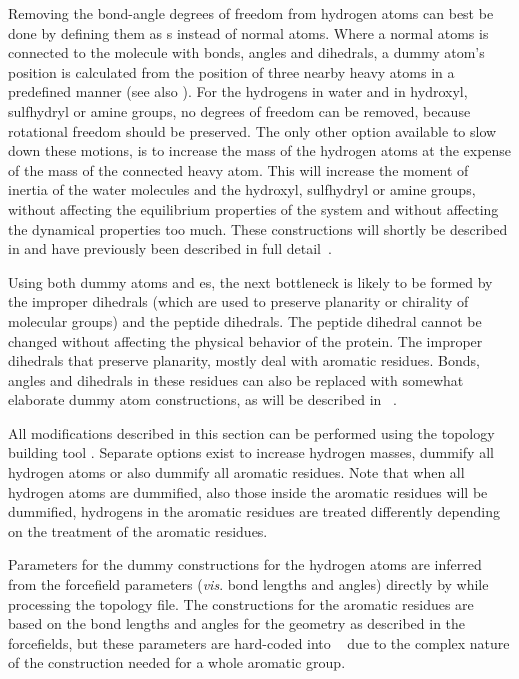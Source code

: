 Removing the bond-angle degrees of freedom from hydrogen atoms can
best be done by defining them as s instead of
normal atoms. Where a normal atoms is connected to the molecule with
bonds, angles and dihedrals, a dummy atom's position is calculated
from the position of three nearby heavy atoms in a predefined manner
(see also ). For the hydrogens in water and in
hydroxyl, sulfhydryl or amine groups, no degrees of freedom can be
removed, because rotational freedom should be preserved. The only
other option available to slow down these motions, is to increase the
mass of the hydrogen atoms at the expense of the mass of the connected
heavy atom. This will increase the moment of inertia of the water
molecules and the hydroxyl, sulfhydryl or amine groups, without
affecting the equilibrium properties of the system and without
affecting the dynamical properties too much. These constructions will
shortly be described in  and have previously
been described in full detail~\cite{feenstra99}.

Using both dummy atoms and es, the next
bottleneck is likely to be formed by the improper dihedrals (which are
used to preserve planarity or chirality of molecular groups) and the
peptide dihedrals. The peptide dihedral cannot be changed without
affecting the physical behavior of the protein. The improper dihedrals
that preserve planarity, mostly deal with aromatic residues. Bonds,
angles and dihedrals in these residues can also be replaced with
somewhat elaborate dummy atom constructions, as will be described in
~\cite{feenstra01}.

All modifications described in this section can be performed using the
{\gromacs} topology building tool {\tt {}}. Separate
options exist to increase hydrogen masses, dummify all hydrogen atoms
or also dummify all aromatic residues. Note that when all hydrogen
atoms are dummified, also those inside the aromatic residues will be
dummified, {\ie} hydrogens in the aromatic residues are treated
differently depending on the treatment of the aromatic residues.

Parameters for the dummy constructions for the hydrogen atoms are
inferred from the forcefield parameters ({\em vis}. bond lengths and
angles) directly by {\tt {}} while processing the
topology file.  The constructions for the aromatic residues are based
on the bond lengths and angles for the geometry as described in the
forcefields, but these parameters are hard-coded into {\tt
{}} due to the complex nature of the construction
needed for a whole aromatic group.


